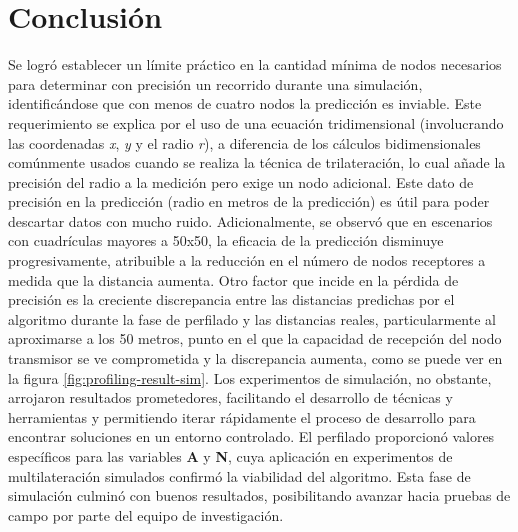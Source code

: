 \section{Conclusión}
Se logró establecer un límite práctico en la cantidad mínima de nodos necesarios para determinar con precisión un recorrido durante una simulación, identificándose que con menos de cuatro nodos la predicción es inviable. Este requerimiento se explica por el uso de una ecuación tridimensional (involucrando las coordenadas \textit{x}, \textit{y} y el radio \textit{r}), a diferencia de los cálculos bidimensionales comúnmente usados cuando se realiza la técnica de trilateración, lo cual añade la precisión del radio a la medición pero exige un nodo adicional.
Este dato de precisión en la predicción (radio en metros de la predicción) es útil para poder descartar datos con mucho ruido. Adicionalmente, se observó que en escenarios con cuadrículas mayores a 50x50, la eficacia de la predicción disminuye progresivamente, atribuible a la reducción en el número de nodos receptores a medida que la distancia aumenta. Otro factor que incide en la pérdida de precisión es la creciente discrepancia entre las distancias predichas por el algoritmo durante la fase de perfilado y las distancias reales, particularmente al aproximarse a los 50 metros, punto en el que la capacidad de recepción del nodo transmisor se ve comprometida y la discrepancia aumenta, como se puede ver en la figura \ref{fig:profiling-result-sim}. Los experimentos de simulación, no obstante, arrojaron resultados prometedores, facilitando el desarrollo de técnicas y herramientas y permitiendo iterar rápidamente el proceso de desarrollo para encontrar soluciones en un entorno controlado. El perfilado proporcionó valores específicos para las variables \textbf{A} y \textbf{N}, cuya aplicación en experimentos de multilateración simulados confirmó la viabilidad del algoritmo. Esta fase de simulación culminó con buenos resultados, posibilitando avanzar hacia pruebas de campo por parte del equipo de investigación.